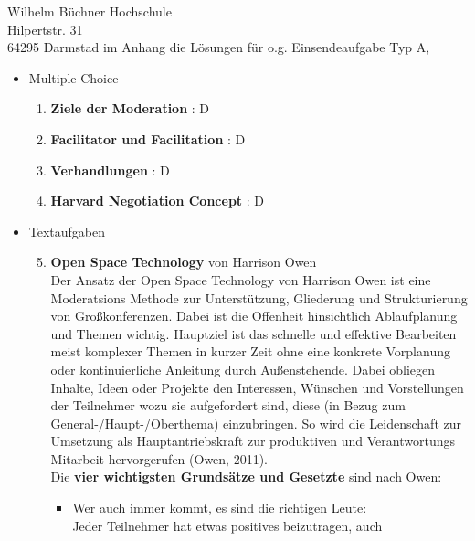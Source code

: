 \documentclass[
    version=last,           %
    DIV=13,                 %
    BCOR=0mm,               %
    paper=a4,               %
    fontsize=12pt,          %
    firsthead=on,           %
    firstfoot=on,           %
    pagenumber=on,i         %
    parskip=half,           %
    enlargefirstpage=,      %
    firsthead=on,           %
    fromrule=afteraddress,  %
    priority=off,           %
    backaddress=true,       %
    refline=dateright,      %
	fromalign=right,	    %
    fromemail=on,i          %
    fromurl=on,             %
    frombank=on,
    fromphone=on,           %
    frommobilephone=on      %
    fromlogo=on,            %
    addrfield=on,           %
    subject=untitled,  %
    foldmarks=off,          %
    numericaldate=off,      %
	pagenumber=right,	        %
	parskip=half,	        %
    headsep=false,          %
    footsepline=true,       %
    foldmarks=off,		    %
	]{scrlttr2}
\begin{document}
\begin{letter} {Wilhelm Büchner Hochschule \\
Hilpertstr. 31\\
64295 Darmstad}
im Anhang die Lösungen für o.g. Einsendeaufgabe Typ A,
\\
\begin{itemize}
    \item Multiple Choice
        \begin{enumerate}
            \item \textbf{Ziele der Moderation} : D \\
            \item \textbf{Facilitator und Facilitation} : D\\
            \item \textbf{Verhandlungen} : D\\
            \item \textbf{Harvard Negotiation Concept} : D \\
        \end{enumerate}
            \vspace{1cm}
    \item Textaufgaben
        \begin{enumerate}
        \setcounter{enumi}{4}
        \item \textbf{Open Space Technology} von Harrison Owen \\
                Der Ansatz der Open Space Technology von Harrison Owen ist eine
                Moderatsions Methode zur Unterstützung, Gliederung und
                Strukturierung von Großkonferenzen. Dabei ist die Offenheit
                hinsichtlich Ablaufplanung und Themen wichtig. Hauptziel ist das
                schnelle und effektive Bearbeiten meist komplexer Themen in
                kurzer Zeit ohne eine konkrete Vorplanung oder kontinuierliche
                Anleitung durch Außenstehende. Dabei obliegen Inhalte, Ideen oder
                Projekte den Interessen, Wünschen und Vorstellungen der
                Teilnehmer wozu sie aufgefordert sind, diese (in Bezug zum
                General-/Haupt-/Oberthema) einzubringen. So wird die
                Leidenschaft zur Umsetzung als Hauptantriebskraft zur
                produktiven und Verantwortungs Mitarbeit hervorgerufen (Owen,
                2011).
                \\
                Die \textbf{vier wichtigsten Grundsätze und Gesetzte} sind nach
                Owen:
                \begin{itemize}
                    \item Wer auch immer kommt, es sind die richtigen Leute: \\
                        Jeder Teilnehmer hat etwas positives beizutragen, auch

\end{itemize}
\end{enumerate}
\end{itemize}
\end{letter}
\end{document}
